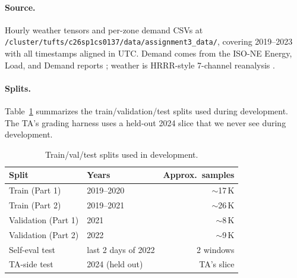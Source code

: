 \documentclass[11pt,letterpaper]{article}
\begin{document}
\paragraph{Source.} Hourly weather tensors and per-zone demand CSVs at \texttt{/cluster/tufts/c26sp1cs0137/data/assignment3\_data/}, covering 2019--2023 with all timestamps aligned in UTC. Demand comes from the ISO-NE Energy, Load, and Demand reports \citep{isone2024data}; weather is HRRR-style 7-channel reanalysis \citep{benjamin2016hrrr,noaa2024hrrr}.

\paragraph{Splits.} Table~\ref{tab:splits} summarizes the train/validation/test splits used during development. The TA's grading harness uses a held-out 2024 slice that we never see during development.

\begin{table}[h]
\centering
\small
\caption{Train/val/test splits used in development.}
\label{tab:splits}
\begin{tabular}{@{}llr@{}}
\toprule
Split & Years & Approx.\ samples \\
\midrule
Train (Part 1)        & 2019--2020              & $\sim$17\,K \\
Train (Part 2)        & 2019--2021              & $\sim$26\,K \\
Validation (Part 1)   & 2021                    & $\sim$8\,K  \\
Validation (Part 2)   & 2022                    & $\sim$9\,K  \\
Self-eval test        & last 2 days of 2022     & 2 windows   \\
TA-side test          & 2024 (held out)         & TA's slice  \\
\bottomrule
\end{tabular}
\end{table}
\end{document}
